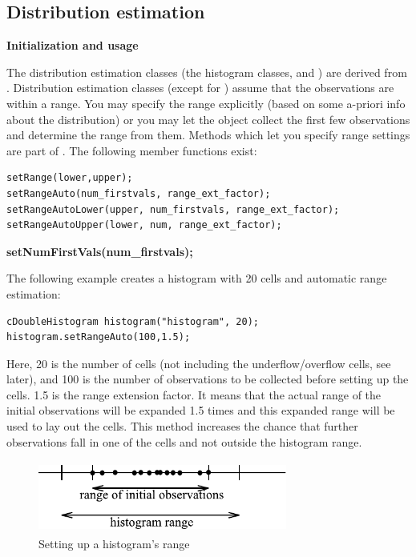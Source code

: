 \subsection{Distribution estimation}

\textbf{Initialization and usage}


The distribution estimation classes (the histogram classes,
 and ) are derived from
. Distribution estimation classes (except for
) assume that the observations are within a range.
You may specify the range explicitly (based on some a-priori info
about the distribution) or you may let the object collect the first
few observations and determine the range from them. Methods which let
you specify range settings are part of . The
following member functions exist:

\begin{Verbatim}
setRange(lower,upper);
setRangeAuto(num_firstvals, range_ext_factor);
setRangeAutoLower(upper, num_firstvals, range_ext_factor);
setRangeAutoUpper(lower, num, range_ext_factor);
\end{Verbatim}

\textbf{setNumFirstVals(num\_firstvals);}


The following example creates a histogram with 20 cells and automatic 
range estimation:

\begin{Verbatim}
cDoubleHistogram histogram("histogram", 20);
histogram.setRangeAuto(100,1.5);
\end{Verbatim}


Here, 20 is the number of cells (not including the underflow/overflow
cells, see later), and 100 is the number of observations to be
collected before setting up the cells. 1.5 is the range extension
factor. It means that the actual range of the initial observations
will be expanded 1.5 times and this expanded range will be used to lay
out the cells. This method increases the chance that further
observations fall in one of the cells and not outside the histogram
range.

\begin{figure}[htbp]
  \begin{center}
    \includegraphics[width=3.215in, height=0.930in]{figures/usmanFig12}
    \caption{Setting up a histogram's range}
  \end{center}
\end{figure}

